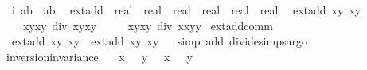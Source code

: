 \begin{isabellebody}
\ \ {\isachardoublequoteopen}i\ {\isacharparenleft}a{\isacharcomma}b{\isacharparenright}\ {\isacharequal}\ {\isacharparenleft}a{\isacharcomma}{\isacharminus}b{\isacharparenright}{\isachardoublequoteclose}\ \isanewline
\isanewline
{}\isamarkupfalse%
\ ext{\isacharunderscore}add\ {\isacharcolon}{\isacharcolon}\ {\isachardoublequoteopen}real\ {\isasymtimes}\ real\ {\isasymRightarrow}\ real\ {\isasymtimes}\ real\ {\isasymRightarrow}\ real\ {\isasymtimes}\ real{\isachardoublequoteclose}\ \isanewline
\ {\isachardoublequoteopen}ext{\isacharunderscore}add\ {\isacharparenleft}x{}{\isacharcomma}y{}{\isacharparenright}\ {\isacharparenleft}x{}{\isacharcomma}y{}{\isacharparenright}\ {\isacharequal}\isanewline
\ \ \ \ {\isacharparenleft}{\isacharparenleft}x{}{\isacharasterisk}y{}{\isacharminus}x{}{\isacharasterisk}y{}{\isacharparenright}\ div\ {\isacharparenleft}x{}{\isacharasterisk}y{}{\isacharminus}x{}{\isacharasterisk}y{}{\isacharparenright}{\isacharcomma}\isanewline
\ \ \ \ \ {\isacharparenleft}x{}{\isacharasterisk}y{}{\isacharplus}x{}{\isacharasterisk}y{}{\isacharparenright}\ div\ {\isacharparenleft}x{}{\isacharasterisk}x{}{\isacharplus}y{}{\isacharasterisk}y{}{\isacharparenright}{\isacharparenright}{\isachardoublequoteclose}\isanewline
\isanewline
{}\isamarkupfalse%
\ ext{\isacharunderscore}add{\isacharunderscore}comm{\isacharcolon}\isanewline
\ \ {\isachardoublequoteopen}ext{\isacharunderscore}add\ {\isacharparenleft}x{}{\isacharcomma}y{}{\isacharparenright}\ {\isacharparenleft}x{}{\isacharcomma}y{}{\isacharparenright}\ {\isacharequal}\ ext{\isacharunderscore}add\ {\isacharparenleft}x{}{\isacharcomma}y{}{\isacharparenright}\ {\isacharparenleft}x{}{\isacharcomma}y{}{\isacharparenright}{\isachardoublequoteclose}\isanewline
%
\isadelimproof
\ \ %
\endisadelimproof
%
\isatagproof
{}\isamarkupfalse%
{\isacharparenleft}simp\ add{\isacharcolon}\ divide{\isacharunderscore}simps{\isacharcomma}argo{\isacharparenright}%
\endisatagproof
{\isafoldproof}%
%
\isadelimproof
\ \isanewline
%
\endisadelimproof
\isanewline
{}\isamarkupfalse%
\ inversion{\isacharunderscore}invariance{\isacharunderscore}{}{\isacharcolon}\isanewline
\ \ \ {\isachardoublequoteopen}x{}\ {\isasymnoteq}\ {}{\isachardoublequoteclose}\ {\isachardoublequoteopen}y{}\ {\isasymnoteq}\ {}{\isachardoublequoteclose}\ {\isachardoublequoteopen}x{}\ {\isasymnoteq}\ {}{\isachardoublequoteclose}\ {\isachardoublequoteopen}y{}\ {\isasymnoteq}\ {}{\isachardoublequoteclose}\ \isanewline

\end{isabellebody}
